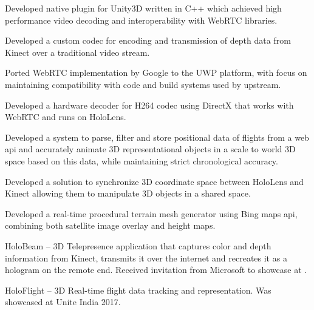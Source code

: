 \documentclass[helvetica,english,nologo,notitle,nototpages,bigfont]{europasscv}
\begin{document}

\begin{europasscv}
\ecvpersonalinfo[10pt]

\vspace{8pt}

\vspace{8pt}


\vspace{4pt}

 {
	\begin{ecvitemize}
		\item Developed native plugin for Unity3D written in C++ which achieved high performance video decoding and interoperability with WebRTC libraries.
		\item Developed a custom codec for encoding and transmission of depth data from Kinect over a traditional video stream.
		\item Ported WebRTC implementation by Google to the UWP platform, with focus on maintaining compatibility with code and build systems used by upstream.
		\item Developed a hardware decoder for H264 codec using DirectX that works with WebRTC and runs on HoloLens.
		\item Developed a system to parse, filter and store positional data of flights from a web api and accurately animate 3D representational objects in a scale to world 3D space based on this data, while maintaining strict chronological accuracy.
		\item Developed a solution to synchronize 3D coordinate space between HoloLens and Kinect allowing them to manipulate 3D objects in a shared space.
		\item Developed a real-time procedural terrain mesh generator using Bing maps api, combining both satellite image overlay and height maps.
	\end{ecvitemize}
}

\vspace{5pt}

 {
	\begin{ecvitemize}
		\item HoloBeam – 3D Telepresence application that captures color and depth information from Kinect, transmits it over the internet and recreates it as a hologram on the remote end. Received invitation from Microsoft to showcase at .
		\item HoloFlight – 3D Real-time flight data tracking and representation. Was showcased at Unite India 2017.
	\end{ecvitemize}
}


\end{europasscv}
\end{document}
